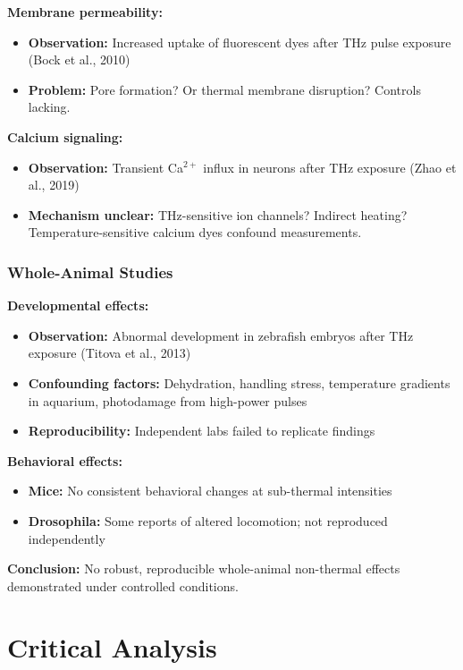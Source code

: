 \textbf{Membrane permeability:}
\begin{itemize}
\item \textbf{Observation:} Increased uptake of fluorescent dyes after THz pulse exposure (Bock et al., 2010)
\item \textbf{Problem:} Pore formation? Or thermal membrane disruption? Controls lacking.
\end{itemize}

\textbf{Calcium signaling:}
\begin{itemize}
\item \textbf{Observation:} Transient Ca$^{2+}$ influx in neurons after THz exposure (Zhao et al., 2019)
\item \textbf{Mechanism unclear:} THz-sensitive ion channels? Indirect heating? Temperature-sensitive calcium dyes confound measurements.
\end{itemize}

\subsubsection{Whole-Animal Studies}

\textbf{Developmental effects:}
\begin{itemize}
\item \textbf{Observation:} Abnormal development in zebrafish embryos after THz exposure (Titova et al., 2013)
\item \textbf{Confounding factors:} Dehydration, handling stress, temperature gradients in aquarium, photodamage from high-power pulses
\item \textbf{Reproducibility:} Independent labs failed to replicate findings
\end{itemize}

\textbf{Behavioral effects:}
\begin{itemize}
\item \textbf{Mice:} No consistent behavioral changes at sub-thermal intensities
\item \textbf{Drosophila:} Some reports of altered locomotion; not reproduced independently
\end{itemize}

\textbf{Conclusion:} No robust, reproducible whole-animal non-thermal effects demonstrated under controlled conditions.

\section{Critical Analysis}
\label{sec:critical-analysis}


